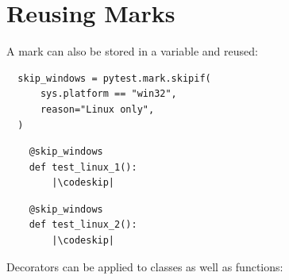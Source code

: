 
\section{Reusing Marks}
A mark can also be stored in a variable and reused:
\vspace{-.25em}

\begin{verbatim}
  skip_windows = pytest.mark.skipif(
      sys.platform == "win32",
      reason="Linux only",
  )
\end{verbatim}

\begin{minipage}{.49\linewidth}
    \begin{verbatim}
    @skip_windows
    def test_linux_1():
        |\codeskip|
    \end{verbatim}
\end{minipage}
\begin{minipage}{.49\linewidth}
    \begin{verbatim}
    @skip_windows
    def test_linux_2():
        |\codeskip|
    \end{verbatim}
\end{minipage}

\vspace{-1em}
Decorators can be applied to classes as well as functions:

